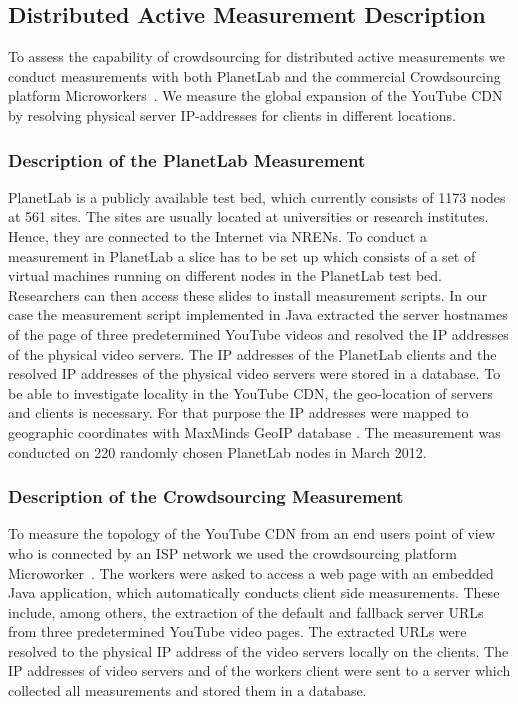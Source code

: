 \subsection{Distributed Active Measurement Description}
\label{sec:method}

To assess the capability of crowdsourcing for distributed active measurements we conduct measurements with both  PlanetLab and the commercial Crowdsourcing platform Microworkers~\cite{microworkers}.
We measure the global expansion of the YouTube CDN by resolving physical server IP-addresses for clients in different locations.

\subsubsection{Description of the PlanetLab Measurement}

PlanetLab is a publicly available test bed, which currently consists of 1173 nodes at 561 sites.
The sites are usually located at universities or research institutes.
Hence, they are connected to the Internet via NRENs.
To conduct a measurement in PlanetLab a slice has to be set up which consists of a set of virtual machines running on different nodes in the PlanetLab test bed.
Researchers can then access these slides to install measurement scripts.
In our case the measurement script implemented in Java extracted the server hostnames of the page of three predetermined YouTube videos and resolved the IP addresses of the physical video servers.
The IP addresses of the PlanetLab clients and the resolved IP addresses of the physical video servers were stored in a database.
To be able to investigate locality in the YouTube CDN, the geo-location of servers and clients is necessary.
For that purpose the IP addresses were mapped to geographic coordinates with MaxMinds GeoIP database \cite{geolite}.
The measurement was conducted on 220 randomly chosen PlanetLab nodes in March 2012.

\subsubsection{Description of the Crowdsourcing Measurement}
To measure the topology of the YouTube CDN from an end users point of view who is connected by an ISP network we used the crowdsourcing platform Microworker~\cite{microworkers}.
The workers were asked to access a web page with an embedded Java application, which automatically conducts client side measurements.
These include, among others, the extraction of the default and fallback server URLs from three predetermined YouTube video pages.
The extracted URLs were resolved to the physical IP address of the video servers locally on the clients.
The IP addresses of video servers and of the workers client were sent to a server which collected all measurements and stored them in a database.

